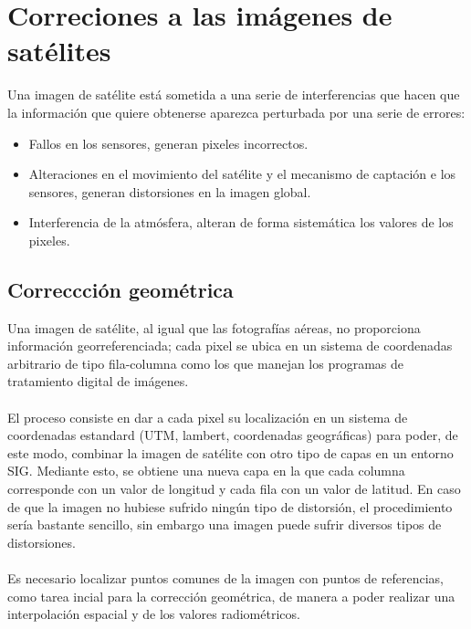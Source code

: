 \section{Correciones a las im\'agenes de sat\'elites}
Una imagen de sat\'elite est\'a sometida a una serie de interferencias que hacen que la informaci\'on que quiere obtenerse aparezca perturbada por una serie de errores:
	\begin{itemize}
		\item Fallos en los sensores, generan pixeles incorrectos.
		\item Alteraciones en el movimiento del sat\'elite y el mecanismo de captaci\'on e los sensores, generan
		distorsiones en la imagen global.
		\item Interferencia de la atm\'osfera, alteran de forma sistem\'atica los valores de los pixeles.
	\end{itemize}


\subsection{Correccci\'on geom\'etrica}
Una imagen de sat\'elite, al igual que las fotograf\'ias a\'ereas, no proporciona informaci\'on georreferenciada; cada pixel se ubica en un sistema de coordenadas arbitrario de tipo fila-columna como los que manejan los programas de tratamiento digital de im\'agenes.\\~\\
El proceso consiste en dar a cada pixel su localizaci\'on en un sistema de coordenadas estandard (UTM, lambert, coordenadas geogr\'aficas) para poder, de este modo, combinar la imagen de sat\'elite con otro tipo de capas en un entorno SIG. Mediante esto, se obtiene una nueva capa en la que cada columna corresponde con un valor de longitud y cada fila con un valor de latitud. En caso de que la imagen no hubiese sufrido ningún tipo de distorsi\'on, el procedimiento ser\'ia bastante sencillo, sin embargo una imagen puede sufrir diversos tipos de distorsiones.\\~\\
Es necesario localizar puntos comunes de la imagen con puntos de referencias, como tarea incial para la correcci\'on geom\'etrica, de manera a poder realizar una interpolaci\'on espacial y de los valores radiom\'etricos\cite{deniseCultivos}.

